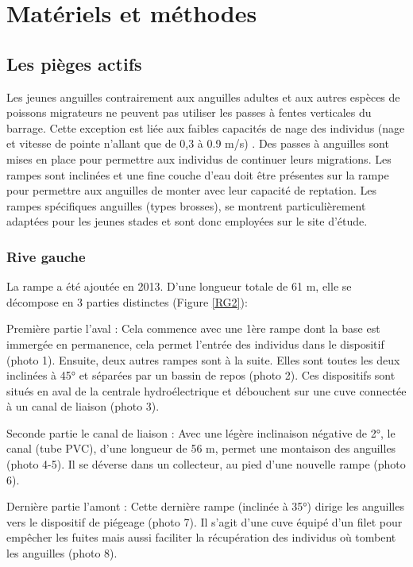 \documentclass[11pt,titlepage,twoside]{article}\usepackage[]{graphicx}\usepackage[table]{xcolor}
\begin{document}
\section{Matériels et méthodes}

\subsection{Les pièges actifs }

Les jeunes anguilles contrairement aux anguilles adultes et aux autres espèces de poissons migrateurs ne peuvent pas utiliser les passes à fentes verticales du barrage. Cette exception est liée aux faibles capacités de nage des individus (nage et vitesse de pointe n’allant que de 0,3 à 0.9 m/s) \citep{cowx_enhancing_2003, crivelli_languille_1998}. Des passes à anguilles sont mises en place pour permettre aux individus de continuer leurs migrations. Les rampes sont inclinées et une fine couche d’eau doit être présentes sur la rampe pour permettre aux anguilles de monter avec leur capacité de reptation. Les rampes spécifiques anguilles (types brosses), se montrent particulièrement adaptées pour les jeunes stades et sont donc employées sur le site d’étude. 

\subsubsection{Rive gauche}

La rampe a été ajoutée en 2013. D’une longueur totale de 61 m, elle se décompose en 3 parties distinctes (Figure \ref{RG2}):

Première partie l’aval : Cela commence avec une 1ère rampe dont la base est immergée en permanence, cela permet l’entrée des individus dans le dispositif (photo 1). Ensuite, deux autres rampes sont à la suite. Elles sont toutes les deux inclinées à 45° et séparées par un bassin de repos (photo 2). Ces dispositifs sont situés en aval de la centrale hydroélectrique et débouchent sur une cuve connectée à un canal de liaison (photo 3). 

Seconde partie le canal de liaison : Avec une légère inclinaison négative de 2°, le canal (tube PVC), d’une longueur de 56 m, permet une montaison des anguilles (photo 4-5). Il se déverse dans un collecteur, au pied d’une nouvelle rampe (photo 6). 

Dernière partie l’amont : Cette dernière rampe (inclinée à 35°) dirige les anguilles vers le dispositif de piégeage (photo 7). Il s’agit d’une cuve équipé d’un filet pour empêcher les fuites mais aussi faciliter la récupération des individus où tombent les anguilles (photo 8). 
\end{document}
